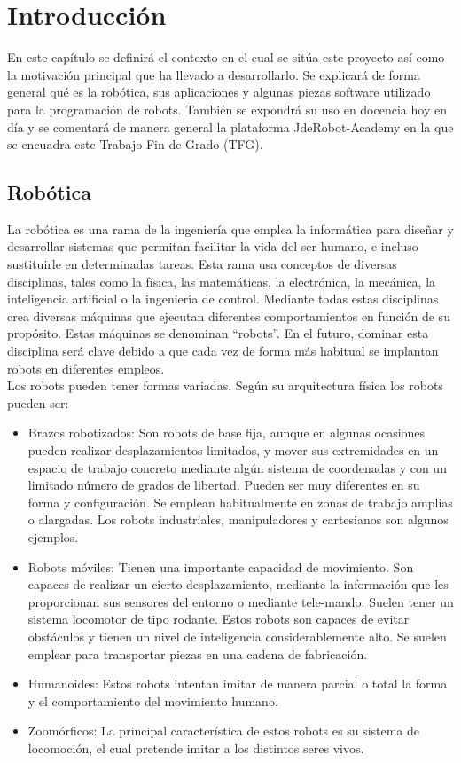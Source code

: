 \chapter{Introducción}\label{cap.introduccion}
En este capítulo se definirá el contexto en el cual se sitúa este proyecto así como la motivación principal que ha llevado a desarrollarlo. Se explicará de forma general qué es la robótica, sus aplicaciones y algunas piezas software utilizado para la programación de robots. También se expondrá su uso en docencia hoy en día y se comentará de manera general la plataforma JdeRobot-Academy en la que se encuadra este Trabajo Fin de Grado (TFG).

\section{Robótica}
La robótica es una rama de la ingeniería que emplea la informática para diseñar y desarrollar sistemas que permitan facilitar la vida del ser humano, e incluso sustituirle en determinadas tareas. Esta rama usa conceptos de diversas disciplinas, tales como la física, las matemáticas, la electrónica, la mecánica, la inteligencia artificial o la ingeniería de control. Mediante todas estas disciplinas crea diversas máquinas que ejecutan diferentes comportamientos en función de su propósito. Estas máquinas se denominan ``robots''. En el futuro, dominar esta disciplina será clave debido a que cada vez de forma más habitual se implantan robots en diferentes empleos. \\

Los robots pueden tener formas variadas. Según su arquitectura física los robots pueden ser:

\begin{itemize} 
    	\item Brazos robotizados: Son robots de base fija, aunque en algunas ocasiones pueden realizar desplazamientos limitados, y mover sus extremidades en un espacio de trabajo concreto mediante algún sistema de coordenadas y con un limitado número de grados de libertad. Pueden ser muy diferentes en su forma y configuración. Se emplean habitualmente en zonas de trabajo amplias o alargadas. Los robots industriales, manipuladores y cartesianos son algunos ejemplos.
    	
		\item Robots móviles: Tienen una importante capacidad de movimiento. Son capaces de realizar un cierto desplazamiento, mediante la información que les proporcionan sus sensores del entorno o mediante tele-mando. Suelen tener un sistema locomotor de tipo rodante. Estos robots son capaces de evitar obstáculos y tienen un nivel de inteligencia considerablemente alto. Se suelen emplear para transportar piezas en una cadena de fabricación.
		
		\item Humanoides: Estos robots intentan imitar de manera parcial o total la forma y el comportamiento del movimiento humano. 
		
		\item Zoomórficos: La principal característica de estos robots es su sistema de locomoción, el cual pretende imitar a los distintos seres vivos.
\end{itemize}


